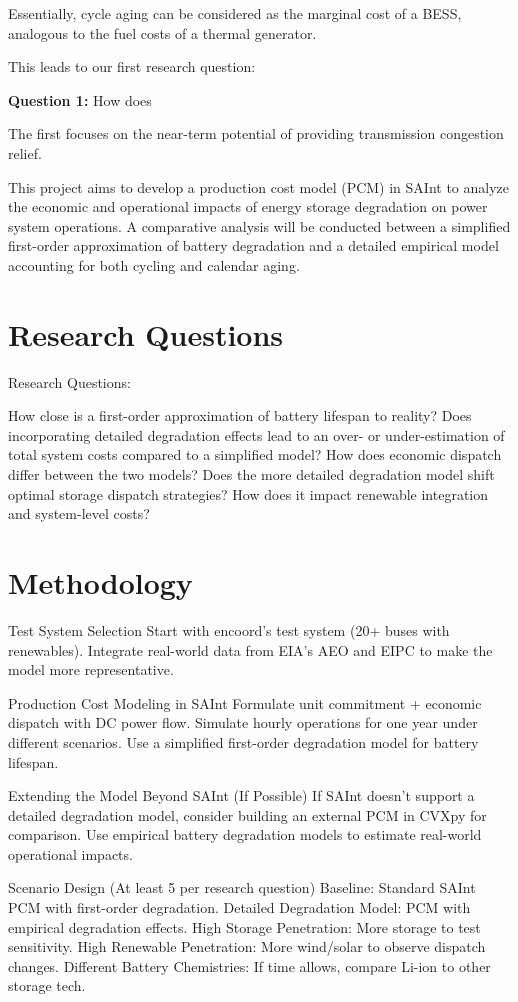\documentclass{homework}
\begin{document}
Essentially, cycle aging can be considered as the marginal cost of a BESS, analogous to the fuel costs of a thermal generator.

This leads to our first research question:


{\bf Question 1:} How does 



The first focuses on the near-term potential
of providing transmission congestion relief. 

This project aims to develop a production cost model (PCM) in SAInt to analyze the economic and operational impacts of energy storage degradation on power system operations.
A comparative analysis will be conducted between a simplified first-order approximation of battery degradation and a detailed empirical model accounting for both cycling and calendar aging.

\section{Research Questions}
Research Questions:

    How close is a first-order approximation of battery lifespan to reality?
        Does incorporating detailed degradation effects lead to an over- or under-estimation of total system costs compared to a simplified model?
    How does economic dispatch differ between the two models?
        Does the more detailed degradation model shift optimal storage dispatch strategies?
        How does it impact renewable integration and system-level costs?

\section{Methodology}

    Test System Selection
        Start with encoord’s test system (20+ buses with renewables).
        Integrate real-world data from EIA’s AEO and EIPC to make the model more representative.

    Production Cost Modeling in SAInt
        Formulate unit commitment + economic dispatch with DC power flow.
        Simulate hourly operations for one year under different scenarios.
        Use a simplified first-order degradation model for battery lifespan.

    Extending the Model Beyond SAInt (If Possible)
        If SAInt doesn’t support a detailed degradation model, consider building an external PCM in CVXpy for comparison.
        Use empirical battery degradation models to estimate real-world operational impacts.

    Scenario Design (At least 5 per research question)
        Baseline: Standard SAInt PCM with first-order degradation.
        Detailed Degradation Model: PCM with empirical degradation effects.
        High Storage Penetration: More storage to test sensitivity.
        High Renewable Penetration: More wind/solar to observe dispatch changes.
        Different Battery Chemistries: If time allows, compare Li-ion to other storage tech.
\end{document}
